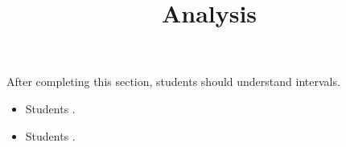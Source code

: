 \documentclass{ximera}
\title{Analysis}
\begin{document}
\begin{abstract}
\end{abstract}

\maketitle

\begin{sectionOutcomes}

After completing this section, students should understand intervals. 

\begin{itemize}
\item Students .
\item Students .
\end{itemize}

\end{sectionOutcomes}
\end{document}
